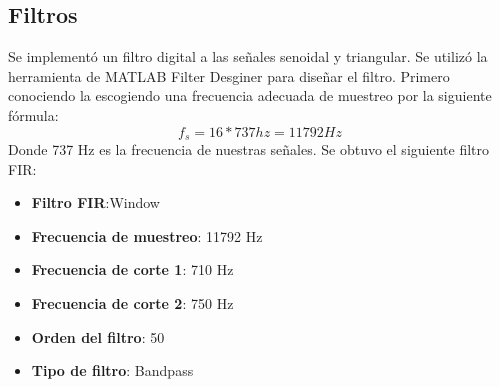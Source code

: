 \documentclass{article}
\begin{document}
\subsection{Filtros}
Se implementó un filtro digital a las señales senoidal y triangular. Se utilizó la herramienta de MATLAB Filter Desginer para diseñar el filtro. 
Primero conociendo la escogiendo una frecuencia adecuada de muestreo por la siguiente fórmula:
\begin{equation}
    f_s = 16 * 737 hz = 11792 Hz
\end{equation}
Donde 737 Hz es la frecuencia de nuestras señales.
Se obtuvo el siguiente filtro FIR:
\begin{itemize}
    \item \textbf{Filtro FIR}:Window
    \item \textbf{Frecuencia de muestreo}:  11792 Hz
    \item \textbf{Frecuencia de corte 1}: 710 Hz
    \item \textbf{Frecuencia de corte 2}: 750 Hz
    \item \textbf{Orden del filtro}: 50
    \item \textbf{Tipo de filtro}: Bandpass
\end{itemize}
\end{document}

